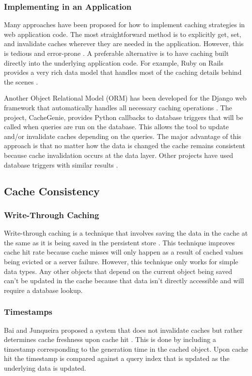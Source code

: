 \documentclass[12pt]{ucthesis}
\begin{document}
\subsubsection{Implementing in an Application}
Many approaches have been proposed for how to implement caching strategies in web application code.
The most straightforward method is to explicitly get, set, and invalidate caches wherever they are needed in the application.
However, this is tedious and error-prone \cite{keyBasedCacheExpiration, triggerBasedORM}.
A preferable alternative is to have caching built directly into the underlying application code.
For example, Ruby on Rails provides a very rich data model that handles most of the caching details behind the scenes \cite{keyBasedCacheExpiration}.

Another Object Relational Model (ORM) has been developed for the Django web framework that automatically handles all necessary caching operations \cite{triggerBasedORM}.
The project, CacheGenie, provides Python callbacks to database triggers that will be called when queries are run on the database. This allows the tool to update and/or invalidate caches depending on the queries.
The major advantage of this approach is that no matter how the data is changed the cache remains consistent because cache invalidation occurs at the data layer.
Other projects have used database triggers with similar results \cite{scalableConsistentCaching}.

\subsection{Cache Consistency}
\subsubsection{Write-Through Caching}
Write-through caching is a technique that involves saving the data in the cache at the same as it is being saved in the persistent store \cite{writeThroughCaching}.
This technique improves cache hit rate because cache misses will only happen as a result of cached values being evicted or a server failure.
However, this technique only works for simple data types.
Any other objects that depend on the current object being saved can't be updated in the cache because that data isn't directly accessible and will require a database lookup.

\subsubsection{Timestamps}
Bai and Junqueira proposed a system that does not invalidate caches but rather determines cache freshness upon cache hit \cite{cacheInvalidationWebSearch}.
This is done by including a timestamp corresponding to the generation time in the cached object.
Upon cache hit the timestamp is compared against a query index that is updated as the underlying data is updated.
\end{document}
